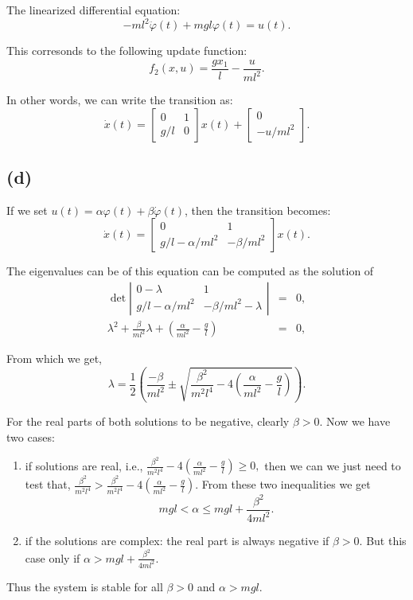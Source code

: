 \documentclass{article}
\begin{document}
The linearized differential equation:
$$-ml^2 \ddot {\varphi} (t) + mgl \varphi(t) = u(t).$$

This corresonds to the following update function:
$$ f_2 (x,u) = \frac{gx_1}{l} - \frac{u}{ml^2}.$$

In other words, we can write the transition as:
$$ \dot{x}(t) = \left[ \begin{array}{cc} 
0 & 1\\
g/l & 0
\end{array} \right] x(t) + \left[\begin{array}{cc}
0\\
-u/ml^2
\end{array}
\right].$$


\subsection*{(d)}

If we set $u(t) = \alpha \varphi(t) + \beta \dot{\varphi}(t)$, then
the transition  becomes:
$$ \dot{x}(t) = \left[ \begin{array}{cc} 
0 & 1\\
g/l - \alpha/ml^2 & -\beta/ml^2
\end{array} \right] x(t).$$

The eigenvalues can be of this equation can be computed as the
solution of 
\begin{eqnarray}
 \det\left| \begin{array}{cc} 
0 - \lambda & 1\\
g/l - \alpha/ml^2 & -\beta/ml^2-\lambda 
\end{array} \right| &=& 0, \\
 \lambda^2 + \frac{\beta}{ml^2}\lambda   +
 \left(\frac{\alpha}{ml^2} - \frac{g}{l}\right) &=& 0,
\end{eqnarray}

From which we get, 
$$\lambda = \frac{1}{2} \left(\frac{-\beta}{ml^2} \pm \sqrt {\frac{\beta^2}{m^2l^4}
 - 4 \left(\frac{\alpha}{ml^2} - \frac{g}{l}\right)}\right).$$


For the real parts of both solutions to be negative, clearly $\beta >
0$. Now we have two cases:
\begin{enumerate}
\item if solutions are real, i.e., 
$  \frac{\beta^2}{m^2l^4}
 - 4 \left(\frac{\alpha}{ml^2} - \frac{g}{l}\right) \ge 0,$ then we
   can we just need to test that, $\frac{\beta^2}{m^2l^4} >  \frac{\beta^2}{m^2l^4}
 - 4 \left(\frac{\alpha}{ml^2} - \frac{g}{l}\right)$. From these two
 inequalities we get
    $$  mgl <\alpha \le mgl + \frac{\beta^2}{4ml^2} .$$

\item if the solutions are complex:  the real part is always
  negative if $\beta > 0$. But this case only if $\alpha  > mgl +
  \frac{\beta^2}{4ml^2}$.
\end{enumerate}

Thus the system is stable for all $\beta > 0$ and $\alpha > mgl$.
\end{document}

